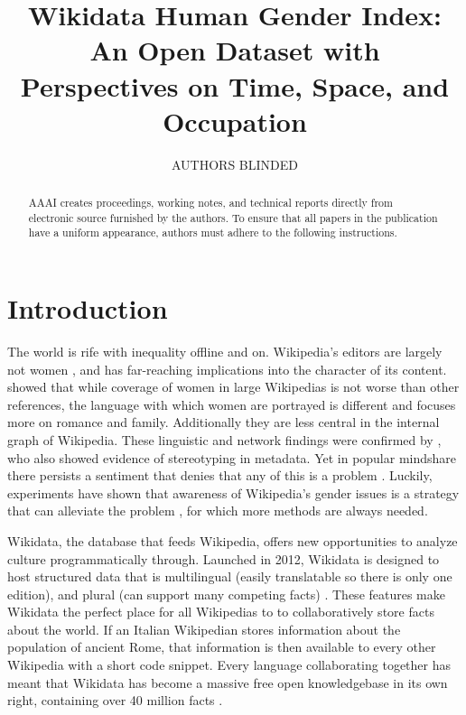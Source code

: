 \documentclass[letterpaper]{article}
\begin{document}
%
\title{Wikidata Human Gender Index: An Open Dataset with Perspectives on Time, Space, and Occupation}

\author{AUTHORS BLINDED}
    
\maketitle
\begin{abstract}
AAAI creates proceedings, working notes, and technical reports directly from electronic source furnished by the authors. To ensure that all papers in the publication have a uniform appearance, authors must adhere to the following instructions. 
\end{abstract}


\section{Introduction}
The world is rife with inequality offline and on. Wikipedia's editors are largely not women \cite{hill_wikipedia_2013}, and has far-reaching implications into the character of its content. \cite{wagner_its_2015} showed that while coverage of women in large Wikipedias is not worse than other references, the language with which women are portrayed is different and focuses more on romance and family. Additionally they are less central in the internal graph of Wikipedia. These linguistic and network findings were confirmed by \cite{graells-garrido_first_2015}, who also showed evidence of stereotyping in metadata. Yet in popular mindshare there persists a sentiment that denies that any of this is a problem \cite{eckert_retriggering_2013}. Luckily, experiments have shown that awareness of Wikipedia's gender issues is a strategy that can alleviate the problem \cite{hinnosaar_gender_2015}, for which more methods are always needed.

Wikidata, the database that feeds Wikipedia, offers new opportunities to analyze culture programmatically through. Launched in 2012, Wikidata is designed to host structured data that is multilingual (easily translatable so there is only one edition), and plural (can support many competing facts) \cite{vrandecic_wikidata:_2014}.  These features make Wikidata the perfect place for all Wikipedias to to collaboratively store facts about the world. If an Italian Wikipedian stores information about the population of ancient Rome, that information is then available to every other Wikipedia with a short code snippet. Every language collaborating together has meant that Wikidata has become a massive free open knowledgebase in its own right, containing over 40 million facts \cite{krotzsch_how_????}.
\end{document}
